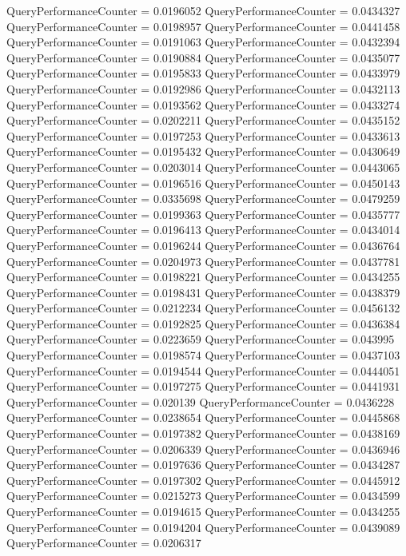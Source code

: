 \documentclass[9pt]{article}
\theoremstyle{plain}
\theoremstyle{definition}
\theoremstyle{remark}
\numberwithin{equation}{section}
\begin{document}
QueryPerformanceCounter  =  0.0196052
QueryPerformanceCounter  =  0.0434327
QueryPerformanceCounter  =  0.0198957
QueryPerformanceCounter  =  0.0441458
QueryPerformanceCounter  =  0.0191063
QueryPerformanceCounter  =  0.0432394
QueryPerformanceCounter  =  0.0190884
QueryPerformanceCounter  =  0.0435077
QueryPerformanceCounter  =  0.0195833
QueryPerformanceCounter  =  0.0433979
QueryPerformanceCounter  =  0.0192986
QueryPerformanceCounter  =  0.0432113
QueryPerformanceCounter  =  0.0193562
QueryPerformanceCounter  =  0.0433274
QueryPerformanceCounter  =  0.0202211
QueryPerformanceCounter  =  0.0435152
QueryPerformanceCounter  =  0.0197253
QueryPerformanceCounter  =  0.0433613
QueryPerformanceCounter  =  0.0195432
QueryPerformanceCounter  =  0.0430649
QueryPerformanceCounter  =  0.0203014
QueryPerformanceCounter  =  0.0443065
QueryPerformanceCounter  =  0.0196516
QueryPerformanceCounter  =  0.0450143
QueryPerformanceCounter  =  0.0335698
QueryPerformanceCounter  =  0.0479259
QueryPerformanceCounter  =  0.0199363
QueryPerformanceCounter  =  0.0435777
QueryPerformanceCounter  =  0.0196413
QueryPerformanceCounter  =  0.0434014
QueryPerformanceCounter  =  0.0196244
QueryPerformanceCounter  =  0.0436764
QueryPerformanceCounter  =  0.0204973
QueryPerformanceCounter  =  0.0437781
QueryPerformanceCounter  =  0.0198221
QueryPerformanceCounter  =  0.0434255
QueryPerformanceCounter  =  0.0198431
QueryPerformanceCounter  =  0.0438379
QueryPerformanceCounter  =  0.0212234
QueryPerformanceCounter  =  0.0456132
QueryPerformanceCounter  =  0.0192825
QueryPerformanceCounter  =  0.0436384
QueryPerformanceCounter  =  0.0223659
QueryPerformanceCounter  =  0.043995
QueryPerformanceCounter  =  0.0198574
QueryPerformanceCounter  =  0.0437103
QueryPerformanceCounter  =  0.0194544
QueryPerformanceCounter  =  0.0444051
QueryPerformanceCounter  =  0.0197275
QueryPerformanceCounter  =  0.0441931
QueryPerformanceCounter  =  0.020139
QueryPerformanceCounter  =  0.0436228
QueryPerformanceCounter  =  0.0238654
QueryPerformanceCounter  =  0.0445868
QueryPerformanceCounter  =  0.0197382
QueryPerformanceCounter  =  0.0438169
QueryPerformanceCounter  =  0.0206339
QueryPerformanceCounter  =  0.0436946
QueryPerformanceCounter  =  0.0197636
QueryPerformanceCounter  =  0.0434287
QueryPerformanceCounter  =  0.0197302
QueryPerformanceCounter  =  0.0445912
QueryPerformanceCounter  =  0.0215273
QueryPerformanceCounter  =  0.0434599
QueryPerformanceCounter  =  0.0194615
QueryPerformanceCounter  =  0.0434255
QueryPerformanceCounter  =  0.0194204
QueryPerformanceCounter  =  0.0439089
QueryPerformanceCounter  =  0.0206317
\end{document}
